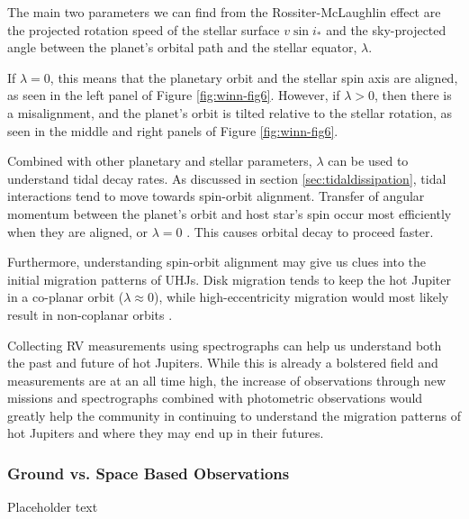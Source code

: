 \documentclass[oneside,12pt]{amsart}
\numberwithin{page}{section}
\begin{document}
The main two parameters we can find from the Rossiter-McLaughlin effect are the projected rotation speed of the stellar surface $v \sin i_*$ and the sky-projected angle between the planet's orbital path and the stellar equator, $\lambda$.

If $\lambda = 0$, this means that the planetary orbit and the stellar spin axis are aligned, as seen in the left panel of Figure \ref{fig:winn-fig6}. However, if $\lambda > 0$, then there is a misalignment, and the planet's orbit is tilted relative to the stellar rotation, as seen in the middle and right panels of Figure \ref{fig:winn-fig6}.

Combined with other planetary and stellar parameters, $\lambda$ can be used to understand tidal decay rates. As discussed in section \ref{sec:tidaldissipation}, tidal interactions tend to move towards spin-orbit alignment. Transfer of angular momentum between the planet's orbit and host star's spin occur most efficiently when they are aligned, or $\lambda = 0$ \citet{ogilvie2014tidal}. This causes orbital decay to proceed faster.

Furthermore, understanding spin-orbit alignment may give us clues into the initial migration patterns of UHJs. Disk migration tends to keep the hot Jupiter in a co-planar orbit ($\lambda \approx 0$), while high-eccentricity migration would most likely result in non-coplanar orbits \citep{triaud2017rossiter}.

Collecting RV measurements using spectrographs can help us understand both the past and future of hot Jupiters. While this is already a bolstered field and measurements are at an all time high, the increase of observations through new missions and spectrographs combined with photometric observations would greatly help the community in continuing to understand the migration patterns of hot Jupiters and where they may end up in their futures.


\subsubsection{Ground vs. Space Based Observations}

Placeholder text
\end{document}
